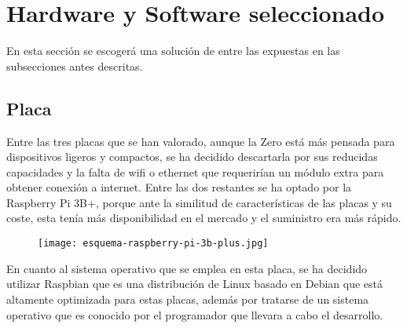 \section{Hardware y Software seleccionado}\label{sec:hardwareSoftware}
En esta sección se escogerá una solución de entre las expuestas en las subsecciones antes descritas.

\subsection{Placa}\label{subsec:placa}
Entre las tres placas que se han valorado, aunque la Zero está más pensada para dispositivos ligeros y compactos, se ha decidido descartarla por sus reducidas capacidades y la falta de wifi o ethernet que requerirían un módulo extra para obtener conexión a internet. Entre las dos restantes se ha optado por la Raspberry Pi 3B+, porque ante la similitud de características de las placas y su coste, esta tenía más disponibilidad en el mercado y el suministro era más rápido. 
\begin{figure}[H]
	{\texttt{[image: esquema-raspberry-pi-3b-plus.jpg]}}\label{fig:esquemaRaspberry3B}
\end{figure}
En cuanto al sistema operativo que se emplea en esta placa, se ha decidido utilizar Raspbian que es una distribución de Linux basado en Debian que está altamente optimizada para estas placas, además por tratarse de un sistema operativo que es conocido por el programador que llevara a cabo el desarrollo.

